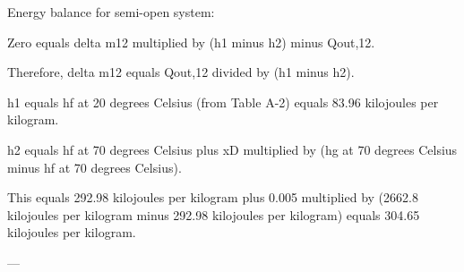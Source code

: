 Energy balance for semi-open system:  

Zero equals delta m12 multiplied by (h1 minus h2) minus Qout,12.  

Therefore, delta m12 equals Qout,12 divided by (h1 minus h2).  

h1 equals hf at 20 degrees Celsius (from Table A-2) equals 83.96 kilojoules per kilogram.  

h2 equals hf at 70 degrees Celsius plus xD multiplied by (hg at 70 degrees Celsius minus hf at 70 degrees Celsius).  

This equals 292.98 kilojoules per kilogram plus 0.005 multiplied by (2662.8 kilojoules per kilogram minus 292.98 kilojoules per kilogram) equals 304.65 kilojoules per kilogram.  

---
